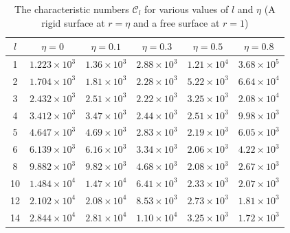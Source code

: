 \begin{table}[ht]
\centering
\caption{The characteristic numbers $\mathcal{C}_l$ for various values of $l$ and $\eta$\newline
(A rigid surface at $r = \eta$ and a free surface at $r = 1$)}
\label{tab:XXIII}
\begin{tabular}{c c c c c c}
\hline
$l$ & $\eta = 0$ & $\eta = 0.1$ & $\eta = 0.3$ & $\eta = 0.5$ & $\eta = 0.8$ \\
\hline
1 & $1.223\times 10^3$ & $1.36\times 10^3$ & $2.88\times 10^3$ & $1.21\times 10^4$ & $3.68\times 10^5$ \\
2 & $1.704\times 10^3$ & $1.81\times 10^3$ & $2.28\times 10^3$ & $5.22\times 10^3$ & $6.64\times 10^4$ \\
3 & $2.432\times 10^3$ & $2.51\times 10^3$ & $2.22\times 10^3$ & $3.25\times 10^3$ & $2.08\times 10^4$ \\
4 & $3.412\times 10^3$ & $3.47\times 10^3$ & $2.44\times 10^3$ & $2.51\times 10^3$ & $9.98\times 10^3$ \\
5 & $4.647\times 10^3$ & $4.69\times 10^3$ & $2.83\times 10^3$ & $2.19\times 10^3$ & $6.05\times 10^3$ \\
6 & $6.139\times 10^3$ & $6.16\times 10^3$ & $3.34\times 10^3$ & $2.06\times 10^3$ & $4.22\times 10^3$ \\
8 & $9.882\times 10^3$ & $9.82\times 10^3$ & $4.68\times 10^3$ & $2.08\times 10^3$ & $2.67\times 10^3$ \\
10 & $1.484\times 10^4$ & $1.47\times 10^4$ & $6.41\times 10^3$ & $2.33\times 10^3$ & $2.07\times 10^3$ \\
12 & $2.102\times 10^4$ & $2.08\times 10^4$ & $8.53\times 10^3$ & $2.73\times 10^3$ & $1.81\times 10^3$ \\
14 & $2.844\times 10^4$ & $2.81\times 10^4$ & $1.10\times 10^4$ & $3.25\times 10^3$ & $1.72\times 10^3$ \\
\hline
\end{tabular}
\end{table}

